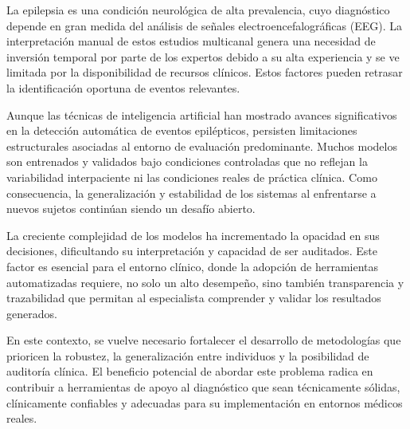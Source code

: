 La epilepsia es una condición neurológica de alta prevalencia, cuyo diagnóstico depende en gran medida del análisis de señales electroencefalográficas (EEG). La interpretación manual de estos estudios multicanal genera una necesidad de inversión temporal por parte de los expertos debido a su alta experiencia y se ve limitada por la disponibilidad de recursos clínicos. Estos factores pueden retrasar la identificación oportuna de eventos relevantes. 

Aunque las técnicas de inteligencia artificial han mostrado avances significativos en la detección automática de eventos epilépticos, persisten limitaciones estructurales asociadas al entorno de evaluación predominante. Muchos modelos son entrenados y validados bajo condiciones controladas que no reflejan la variabilidad interpaciente ni las condiciones reales de práctica clínica. Como consecuencia, la generalización y estabilidad de los sistemas al enfrentarse a nuevos sujetos continúan siendo un desafío abierto.

La creciente complejidad de los modelos ha incrementado la opacidad en sus decisiones, dificultando su interpretación y capacidad de ser auditados. Este factor es esencial para el entorno clínico, donde la adopción de herramientas automatizadas requiere, no solo un alto desempeño, sino también transparencia y trazabilidad que permitan al especialista comprender y validar los resultados generados.

En este contexto, se vuelve necesario fortalecer el desarrollo de metodologías que prioricen la robustez, la generalización entre individuos y la posibilidad de auditoría clínica. El beneficio potencial de abordar este problema radica en contribuir a herramientas de apoyo al diagnóstico que sean técnicamente sólidas, clínicamente confiables y adecuadas para su implementación en entornos médicos reales.